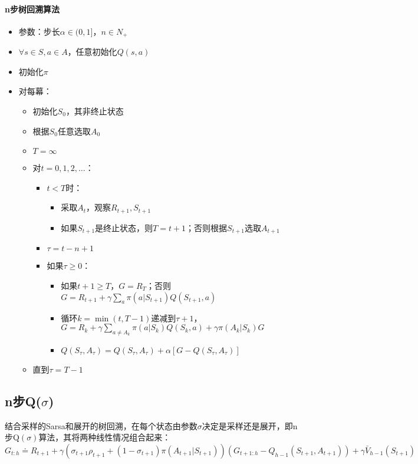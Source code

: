 \documentclass[
12pt, %
a4paper, 
oneside, %
headinclude,footinclude, %
]{scrartcl}
\begin{document}
\paragraph{n步树回溯算法}
\begin{itemize}
\item 参数：步长$ \alpha \in (0,1] $，$ n \in N_+ $
\item $ \forall s \in S, a \in A $，任意初始化$ Q(s, a) $
\item 初始化$ \pi $
\item 对每幕：
\begin{itemize}
\item 初始化$ S_0 $，其非终止状态
\item 根据$ S_0 $任意选取$ A_0 $
\item $ T = \infty $
\item 对$ t = 0, 1, 2, \dots $：
\begin{itemize}
\item $ t < T $时：
\begin{itemize}
\item 采取$ A_t $，观察$ R_{t + 1}, S_{t + 1} $
\item 如果$ S_{t + 1} $是终止状态，则$ T = t + 1 $；否则根据$ S_{t + 1} $选取$ A_{t + 1} $
\end{itemize}
\item $ \tau = t - n + 1 $
\item 如果$ \tau \geq 0 $：
\begin{itemize}
\item 如果$ t + 1 \geq T $，$ G = R_T $；否则$ G = R_{t + 1} + \gamma \sum_a \pi(a|S_{t + 1})Q(S_{t + 1},a) $
\item 循环$ k = \min(t, T - 1) $递减到$ \tau + 1 $，$ G = R_k + \gamma \sum_{a \neq A_k} \pi(a|S_k)Q(S_k,a) + \gamma \pi(A_k|S_k)G $
\item $ Q(S_{\tau},A_{\tau}) = Q(S_{\tau},A_{\tau}) + \alpha[G - Q(S_{\tau},A_{\tau})] $
\end{itemize}
\end{itemize}
\item 直到$ \tau = T - 1 $
\end{itemize}
\end{itemize}
\subsection{n步Q($ \sigma $)}
结合采样的Sarsa和展开的树回溯，在每个状态由参数$ \sigma $决定是采样还是展开，即n步Q$ (\sigma) $算法，其将两种线性情况组合起来：
$$ G_{t:h} \doteq R_{t + 1} + \gamma (\sigma_{t + 1} \rho_{t + 1} + (1 - \sigma_{t + 1}) \pi(A_{t + 1}|S_{t + 1}))(G_{t + 1:h} - Q_{h - 1}(S_{t + 1}, A_{t + 1})) + \gamma \bar{V}_{h - 1}(S_{t + 1}) $$
\end{document}
